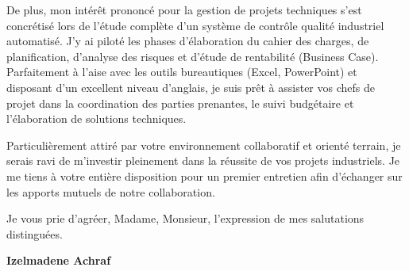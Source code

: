 \documentclass[10pt,a4paper]{../../templates/altacv}
\begin{document}
\vspace{0.4cm}

De plus, mon intérêt prononcé pour la gestion de projets techniques s'est concrétisé lors de l'étude complète d'un système de contrôle qualité industriel automatisé. J'y ai piloté les phases d'élaboration du cahier des charges, de planification, d'analyse des risques et d'étude de rentabilité (Business Case). Parfaitement à l'aise avec les outils bureautiques (Excel, PowerPoint) et disposant d'un excellent niveau d'anglais, je suis prêt à assister vos chefs de projet dans la coordination des parties prenantes, le suivi budgétaire et l'élaboration de solutions techniques.

\vspace{0.4cm}

Particulièrement attiré par votre environnement collaboratif et orienté terrain, je serais ravi de m'investir pleinement dans la réussite de vos projets industriels. Je me tiens à votre entière disposition pour un premier entretien afin d'échanger sur les apports mutuels de notre collaboration.

\vspace{0.5cm}

Je vous prie d'agréer, Madame, Monsieur, l'expression de mes salutations distinguées.

\vfill

\begin{flushright}
  \Large\color{emphasis}\textbf{Izelmadene Achraf}
\end{flushright}
\end{document}
